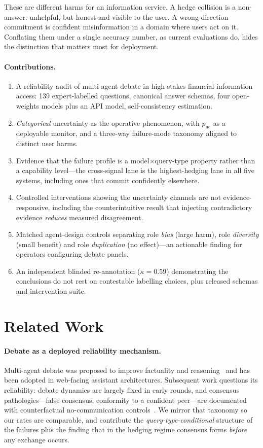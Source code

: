 \documentclass[sigconf,anonymous,review]{acmart}
\begin{document}
These are different harms for an information service. A hedge collision is a
non-answer: unhelpful, but honest and visible to the user. A wrong-direction
commitment is confident misinformation in a domain where users act on it.
Conflating them under a single accuracy number, as current evaluations do,
hides the distinction that matters most for deployment.

\paragraph{Contributions.}
\begin{enumerate}
\item A reliability audit of multi-agent debate in high-stakes financial
information access: 139 expert-labelled questions, canonical answer schemas,
four open-weights models plus an API model, self-consistency estimation.
\item \emph{Categorical} uncertainty as the operative phenomenon, with
$p_{\mathrm{nc}}$ as a deployable monitor, and a three-way failure-mode
taxonomy aligned to distinct user harms.
\item Evidence that the failure profile is a model$\times$query-type
property rather than a capability level---the cross-signal lane is the
highest-hedging lane in all five systems, including ones that commit
confidently elsewhere.
\item Controlled interventions showing the uncertainty channels are not
evidence-responsive, including the counterintuitive result that injecting
contradictory evidence \emph{reduces} measured disagreement.
\item Matched agent-design controls separating role \emph{bias} (large harm),
role \emph{diversity} (small benefit) and role \emph{duplication} (no
effect)---an actionable finding for operators configuring debate panels.
\item An independent blinded re-annotation ($\kappa = 0.59$) demonstrating
the conclusions do not rest on contestable labelling choices, plus released
schemas and intervention suite.
\end{enumerate}

\section{Related Work}

\paragraph{Debate as a deployed reliability mechanism.} Multi-agent debate
was proposed to improve factuality and
reasoning~\cite{du2023debate} and has been adopted in web-facing assistant
architectures. Subsequent work questions its reliability: debate dynamics are
largely fixed in early rounds, and consensus pathologies---false consensus,
conformity to a confident peer---are documented with counterfactual
no-communication controls~\cite{cagecal2026,flips2026,masuncertainty2026}. We
mirror that taxonomy so our rates are comparable, and contribute the
\emph{query-type-conditional} structure of the failures plus the finding that
in the hedging regime consensus forms \emph{before} any exchange occurs.
\end{document}
